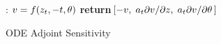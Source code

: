 \documentclass[twoside]{article}
\begin{document}
\begin{figure*}[h!]
	\begin{minipage}[t]{0.49\linewidth}
		\begin{algorithm}[H]
			\centering
			\caption{ \footnotesize{ODE Adjoint Sensitivity} } \label{algo:ode_adjoint}
			\begin{algorithmic}
				\vspace{.75mm}
\vspace{.75mm}
				:
				\State $v = f(z_t, -t, \theta)$
				\State \textbf{return} $\![
				-v, \;
				a_t {\partial v}/{\partial z}, \;
				a_t {\partial v}/{\partial \theta} \,]$ 
				\EndFunction
				

\end{algorithmic}
\end{algorithm}
\end{minipage}
\end{figure*}
\end{document}
